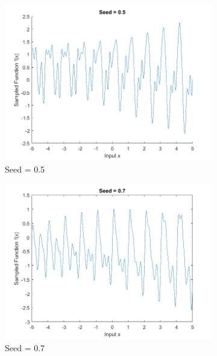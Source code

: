 \documentclass[]{article}
\begin{document}
\begin{figure}[!h]
	\begin{subfigure}{0.3\linewidth}
		\centering
		\includegraphics[width=\linewidth]{1d1}
		\caption{Seed = 0.5}
		\label{fig:1d1}
	\end{subfigure}
	\begin{subfigure}{0.3\linewidth}
		\centering
		\includegraphics[width=\linewidth]{1d2}
		\caption{Seed = 0.7}
		\label{fig:1d2}
	\end{subfigure}
	\begin{subfigure}{0.3\linewidth}
		\centering

\end{subfigure}
\end{figure}
\end{document}
